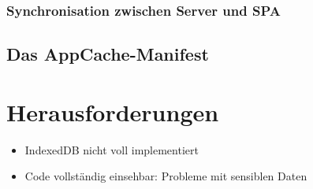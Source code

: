 \subsubsection*{Synchronisation zwischen Server und SPA}
\label{ssec:Sync-SPA}

\subsection{Das AppCache-Manifest}
\label{ssec:appcache-manifest}

\section{Herausforderungen}
\label{sec:Herausforderungen-SPA}
\begin{itemize}
\item IndexedDB nicht voll implementiert
\item Code vollständig einsehbar: Probleme mit sensiblen Daten
\end{itemize}
